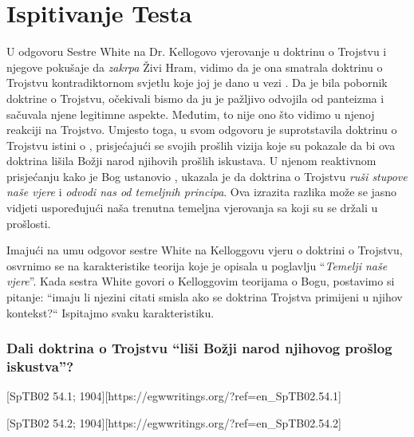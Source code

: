 \chapter{Ispitivanje Testa}

U odgovoru Sestre White na Dr. Kellogovo vjerovanje u doktrinu o Trojstvu i njegove pokušaje da \textit{zakrpa} Živi Hram, vidimo da je ona smatrala doktrinu o Trojstvu kontradiktornom svjetlu koje joj je dano u vezi . Da je bila pobornik doktrine o Trojstvu, očekivali bismo da ju je pažljivo odvojila od panteizma i sačuvala njene legitimne aspekte. Međutim, to nije ono što vidimo u njenoj reakciji na Trojstvo. Umjesto toga, u svom odgovoru je suprotstavila doktrinu o Trojstvu istini o , prisjećajući se svojih prošlih vizija koje su pokazale da bi ova doktrina lišila Božji narod njihovih prošlih iskustava. U njenom reaktivnom prisjećanju kako je Bog ustanovio , ukazala je da doktrina o Trojstvu \textit{ruši stupove naše vjere} i \textit{odvodi nas od temeljnih principa}. Ova izrazita razlika može se jasno vidjeti uspoređujući naša trenutna temeljna vjerovanja sa  koji su se držali u prošlosti.

Imajući na umu odgovor sestre White na Kelloggovu vjeru o doktrini o Trojstvu, osvrnimo se na karakteristike teorija koje je opisala u poglavlju “\textit{Temelji naše vjere}”. Kada sestra White govori o Kelloggovim teorijama o Bogu, postavimo si pitanje: “imaju li njezini citati smisla ako se doktrina Trojstva primijeni u njihov kontekst?“ Ispitajmo svaku karakteristiku.

\subsection*{Dali doktrina o Trojstvu “liši Božji narod njihovog prošlog iskustva”?}

[SpTB02 54.1; 1904][https://egwwritings.org/?ref=en\_SpTB02.54.1]

[SpTB02 54.2; 1904][https://egwwritings.org/?ref=en\_SpTB02.54.2]

